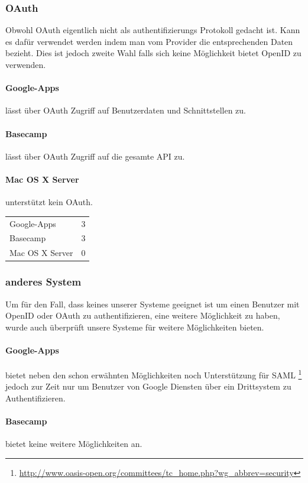 \subsubsection{OAuth}
\label{ssub:Bewertung OAuth}
Obwohl OAuth eigentlich nicht als authentifizierungs Protokoll gedacht ist. Kann
es dafür verwendet werden indem man vom Provider die entsprechenden Daten
bezieht. Dies ist jedoch zweite Wahl falls sich keine Möglichkeit bietet OpenID
zu verwenden.
\paragraph{Google-Apps}
\label{par:2.2Google-Apps}
lässt über OAuth Zugriff auf Benutzerdaten und Schnittstellen zu.
\paragraph{Basecamp}
\label{par:2.2Basecamp}
lässt über OAuth Zugriff auf die gesamte API zu.
\paragraph{Mac OS X Server}
\label{par:2.2Mac OS X Server}
unterstützt kein OAuth.

\begin{tabular}{lc}
Google-Apps & 3\\
Basecamp & 3\\
Mac OS X Server & 0\\
\end{tabular}

\subsubsection{anderes System}
\label{ssub:anderes System}
Um für den Fall, dass keines unserer Systeme geeignet ist um einen Benutzer mit
OpenID oder OAuth zu authentifizieren, eine weitere Möglichkeit zu haben, wurde
auch überprüft unsere Systeme für weitere Möglichkeiten bieten.
\paragraph{Google-Apps}
\label{par:2.3Google-Apps}
bietet neben den schon erwähnten Möglichkeiten noch Unterstützung für SAML
\footnote{\url{http://www.oasis-open.org/committees/tc_home.php?wg_abbrev=security}}
jedoch zur Zeit nur um Benutzer von Google Diensten über ein Drittsystem zu
Authentifizieren.
\paragraph{Basecamp}
\label{par:2.3Basecamp}
bietet keine weitere Möglichkeiten an.
